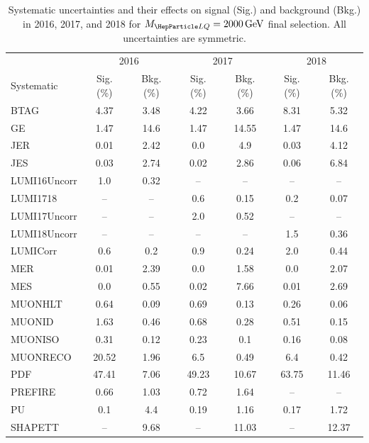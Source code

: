 \begin{table}[H]
	\begin{center}
        \begin{footnotesize}
			\caption{Systematic uncertainties and their effects on signal (Sig.) and background (Bkg.) in 2016, 2017, and 2018 for $\MLQ = \SI{2000}{GeV}$ final selection. All uncertainties are symmetric.}
			\begin{tabular}{lcccccc} \hline \hline
				& \multicolumn{2}{c}{2016} & \multicolumn{2}{c}{2017} & \multicolumn{2}{c}{2018} \\
				Systematic & Sig. (\%) & Bkg. (\%) & Sig. (\%) & Bkg. (\%) & Sig. (\%) & Bkg. (\%) \\ \hline
				BTAG &  4.37  &  3.48 &  4.22  &  3.66 &  8.31  &  5.32 \\
				GE &  1.47  &  14.6 &  1.47  &  14.55 &  1.47  &  14.6 \\
				JER &  0.01  &  2.42 &  0.0  &  4.9 &  0.03  &  4.12 \\
				JES &  0.03  &  2.74 &  0.02  &  2.86 &  0.06  &  6.84 \\
				LUMI16Uncorr &  1.0  &  0.32 & -- & -- & -- & -- \\
				LUMI1718 & -- & -- &  0.6  &  0.15 &  0.2  &  0.07 \\
				LUMI17Uncorr & -- & -- &  2.0  &  0.52 & -- & -- \\
				LUMI18Uncorr & -- & -- & -- & -- &  1.5  &  0.36 \\
				LUMICorr &  0.6  &  0.2 &  0.9  &  0.24 &  2.0  &  0.44 \\
				MER &  0.01  &  2.39 &  0.0  &  1.58 &  0.0  &  2.07 \\
				MES &  0.0  &  0.55 &  0.02  &  7.66 &  0.01  &  2.69 \\
				MUONHLT &  0.64  &  0.09 &  0.69  &  0.13 &  0.26  &  0.06 \\
				MUONID &  1.63  &  0.46 &  0.68  &  0.28 &  0.51  &  0.15 \\
				MUONISO &  0.31  &  0.12 &  0.23  &  0.1 &  0.16  &  0.08 \\
				MUONRECO &  20.52  &  1.96 &  6.5  &  0.49 &  6.4  &  0.42 \\
				PDF &  47.41  &  7.06 &  49.23  &  10.67 &  63.75  &  11.46 \\
				PREFIRE &  0.66  &  1.03 &  0.72  &  1.64 & -- & -- \\
				PU &  0.1  &  4.4 &  0.19  &  1.16 &  0.17  &  1.72 \\
				SHAPETT & -- &  9.68 & -- &  11.03 & -- &  12.37 \\

\end{tabular}
\end{footnotesize}
\end{center}
\end{table}
